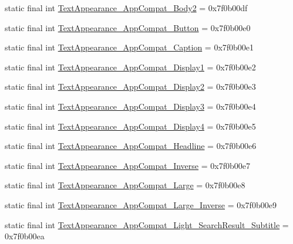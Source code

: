 \begin{CompactItemize}
static final int \hyperlink{classandroid_1_1support_1_1v7_1_1cardview_1_1_r_1_1style_2b3ef1f44b2471eb4d412b8980729e94}{TextAppearance\_\-AppCompat\_\-Body2} = 0x7f0b00df
\item 
static final int \hyperlink{classandroid_1_1support_1_1v7_1_1cardview_1_1_r_1_1style_7210ba53380e3d4bca39149e2d426b1b}{TextAppearance\_\-AppCompat\_\-Button} = 0x7f0b00e0
\item 
static final int \hyperlink{classandroid_1_1support_1_1v7_1_1cardview_1_1_r_1_1style_8f3755708e1dbcad4e13ccedb800cae9}{TextAppearance\_\-AppCompat\_\-Caption} = 0x7f0b00e1
\item 
static final int \hyperlink{classandroid_1_1support_1_1v7_1_1cardview_1_1_r_1_1style_ca6b5054a2e80d14cefd08f18bb06bf5}{TextAppearance\_\-AppCompat\_\-Display1} = 0x7f0b00e2
\item 
static final int \hyperlink{classandroid_1_1support_1_1v7_1_1cardview_1_1_r_1_1style_685010e7d8297c9af0d6eecdbec2a720}{TextAppearance\_\-AppCompat\_\-Display2} = 0x7f0b00e3
\item 
static final int \hyperlink{classandroid_1_1support_1_1v7_1_1cardview_1_1_r_1_1style_cdc4ce96e084c890724e774d467c421d}{TextAppearance\_\-AppCompat\_\-Display3} = 0x7f0b00e4
\item 
static final int \hyperlink{classandroid_1_1support_1_1v7_1_1cardview_1_1_r_1_1style_a8ab06218d4ca8f40a8eda0d321e84f2}{TextAppearance\_\-AppCompat\_\-Display4} = 0x7f0b00e5
\item 
static final int \hyperlink{classandroid_1_1support_1_1v7_1_1cardview_1_1_r_1_1style_cc16dafe54c33383dc32e72c7fe05d2d}{TextAppearance\_\-AppCompat\_\-Headline} = 0x7f0b00e6
\item 
static final int \hyperlink{classandroid_1_1support_1_1v7_1_1cardview_1_1_r_1_1style_1b174e5ead1a63b8dd57865a47499438}{TextAppearance\_\-AppCompat\_\-Inverse} = 0x7f0b00e7
\item 
static final int \hyperlink{classandroid_1_1support_1_1v7_1_1cardview_1_1_r_1_1style_fc72b13f322ae84e264adfc73ac70a2b}{TextAppearance\_\-AppCompat\_\-Large} = 0x7f0b00e8
\item 
static final int \hyperlink{classandroid_1_1support_1_1v7_1_1cardview_1_1_r_1_1style_341f94ccbba27c06bd31ae7b33ae3773}{TextAppearance\_\-AppCompat\_\-Large\_\-Inverse} = 0x7f0b00e9
\item 
static final int \hyperlink{classandroid_1_1support_1_1v7_1_1cardview_1_1_r_1_1style_2e375f239bd2e76c9942a8fcd6ace356}{TextAppearance\_\-AppCompat\_\-Light\_\-SearchResult\_\-Subtitle} = 0x7f0b00ea

\end{CompactItemize}
